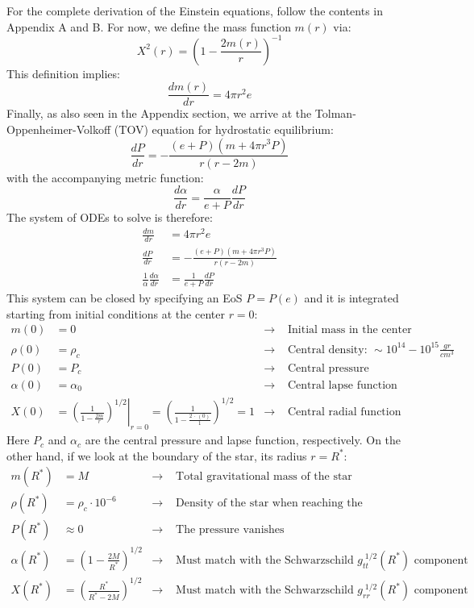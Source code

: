 \documentclass[12pt]{report}
\begin{document}
	For the complete derivation of the Einstein equations, follow the contents in Appendix A and B. For now, we define the mass function $m(r)$ via:
	\begin{equation}
		X^2(r)=\left(1-\frac{2m(r)}{r}\right)^{-1}
	\end{equation}
	This definition implies:
	\begin{equation}
		\frac{d m(r)}{d r}=4\pi r^2 e
	\end{equation}
	Finally, as also seen in the Appendix section, we arrive at the Tolman-Oppenheimer-Volkoff (TOV) equation for hydrostatic equilibrium:
	\begin{equation}
		\boxed{\frac{dP}{dr}=-\frac{(e+P)(m+4\pi r^3 P)}{r(r-2m)}}
	\end{equation}
	with the accompanying metric function:
	\begin{equation}
		\boxed{\frac{d\alpha}{dr}=\frac{\alpha}{e+P}\frac{dP}{dr}}
	\end{equation}
	The system of ODEs to solve is therefore:
	\begin{align}
		\frac{dm}{dr}&=4\pi r^2 e\\
		\frac{dP}{dr}&=-\frac{(e+P)(m+4\pi r^3 P)}{r(r-2m)}\\
		\frac{1}{\alpha}\frac{d\alpha}{dr}&=\frac{1}{e+P}\frac{dP}{dr}
	\end{align}
	This system can be closed by specifying an EoS $P=P(e)$ and it is integrated starting from initial conditions at the center $r=0$:
	\begin{align*}
		m(0) &= 0 &\rightarrow& \text{ Initial mass in the center is a single point}\\
		\rho(0) &= \rho_c &\rightarrow& \text{ Central density: } \sim10^{14}-10^{15} \frac{gr}{cm^3}\\
		P(0) &= P_c &\rightarrow& \text{ Central pressure}\\
		\alpha(0) &= \alpha_0 &\rightarrow& \text{ Central lapse function}\\
		X(0) &= \left.\left(\frac{1}{1-\frac{2m}{r}}\right)^{1/2}\right|_{r=0} = \left(\frac{1}{1-\frac{2\,\cdot \,(0)}{1}}\right)^{1/2} = 1&\rightarrow& \text{ Central radial function}
	\end{align*}
	Here $P_c$ and $\alpha_c$ are the central pressure and lapse function, respectively. On the other hand, if we look at the boundary of the star, its radius $r=R^*$:
	\begin{align*}
		m(R^*) &= M &\rightarrow& \text{ Total gravitational mass of the star}\\
		\rho(R^*) &= \rho_c\cdot 10^{-6} &\rightarrow& \text{ Density of the star when reaching the atmosphere}\\
		P(R^*) &\approx 0 &\rightarrow& \text{ The pressure vanishes}\\
		\alpha(R^*) &= \left(1-\frac{2M}{R^*}\right)^{1/2} &\rightarrow& \text{ Must match with the Schwarzschild }g_{tt}^{\;1/2}(R^*)\text{ component}\\
		X(R^*) &= \left(\frac{R^*}{R^*-2M}\right)^{1/2} &\rightarrow& \text{ Must match with the Schwarzschild  }g_{rr}^{\;1/2}(R^*)\text{ component}
	\end{align*}
\end{document}
